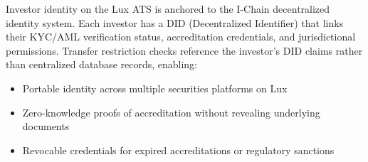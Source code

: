 Investor identity on the Lux ATS is anchored to the I-Chain decentralized identity system. Each investor has a DID (Decentralized Identifier) that links their KYC/AML verification status, accreditation credentials, and jurisdictional permissions. Transfer restriction checks reference the investor's DID claims rather than centralized database records, enabling:

\begin{itemize}[nosep]
  \item Portable identity across multiple securities platforms on Lux
  \item Zero-knowledge proofs of accreditation without revealing underlying documents
  \item Revocable credentials for expired accreditations or regulatory sanctions
\end{itemize}

